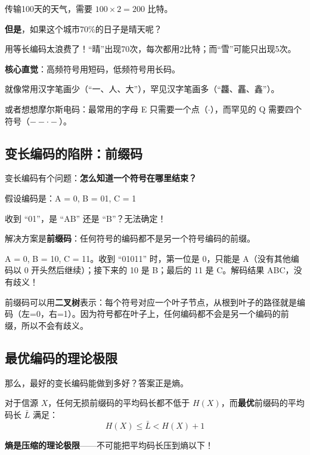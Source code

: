 传输100天的天气，需要 $100 \times 2 = 200$ 比特。

\textbf{但是}，如果这个城市70\%的日子是晴天呢？

用等长编码太浪费了！“晴”出现70次，每次都用2比特；而“雪”可能只出现5次。

\begin{insightbox}
\textbf{核心直觉}：高频符号用短码，低频符号用长码。

就像常用汉字笔画少（“一、人、大”），罕见汉字笔画多（“{\rarecjkfont 龘、靐}、鑫”）。

或者想想摩尔斯电码：最常用的字母 E 只需要一个点（$\cdot$），而罕见的 Q 需要四个符号（$--\cdot-$）。
\end{insightbox}

\subsection{变长编码的陷阱：前缀码}

变长编码有个问题：\textbf{怎么知道一个符号在哪里结束？}

\begin{example}[歧义编码]
假设编码是：A = 0, B = 01, C = 1

收到 “01”，是 “AB” 还是 “B”？无法确定！
\end{example}

解决方案是\textbf{前缀码}：任何符号的编码都不是另一个符号编码的前缀。

\begin{example}[前缀码]
A = 0, B = 10, C = 11。收到 “01011” 时，第一位是 0，只能是 A（没有其他编码以 0 开头然后继续）；接下来的 10 是 B；最后的 11 是 C。解码结果 ABC，没有歧义！
\end{example}

\begin{physicalmeaning}
前缀码可以用\textbf{二叉树}表示：每个符号对应一个叶子节点，从根到叶子的路径就是编码（左=0，右=1）。因为符号都在叶子上，任何编码都不会是另一个编码的前缀，所以不会有歧义。
\end{physicalmeaning}

\subsection{最优编码的理论极限}

那么，最好的变长编码能做到多好？答案正是熵。

\begin{keytheorem}[title=Shannon第一定理（信源编码定理）]
对于信源 $X$，任何无损前缀码的平均码长都不低于 $H(X)$，而\textbf{最优}前缀码的平均码长 $\bar{L}$ 满足：
\begin{equation}
H(X) \leq \bar{L} < H(X) + 1
\end{equation}

\textbf{熵是压缩的理论极限}——不可能把平均码长压到熵以下！
\end{keytheorem}

